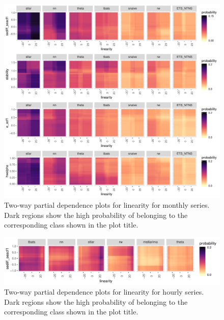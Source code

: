 \documentclass[11pt,a4paper,]{article}
\begin{document}
\begin{figure}[h]

{\centering \includegraphics[width=\textwidth]{figure/m2dpdp-1} 

}

\caption{Two-way partial dependence plots for linearity for monthly series. Dark regions show the high probability of belonging to the corresponding class shown in the plot title.}\label{fig:m2dpdp}
\end{figure}

\clearpage

\begin{figure}[h]

{\centering \includegraphics[width=\textwidth]{figure/h2dpdp-1} 

}

\caption{Two-way partial dependence plots for linearity for hourly series. Dark regions show the high probability of belonging to the corresponding class shown in the plot title.}\label{fig:h2dpdp}
\end{figure}
\end{document}
